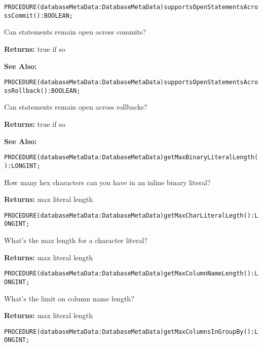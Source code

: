 \verb'PROCEDURE(databaseMetaData:DatabaseMetaData)supportsOpenStatementsAcrossCommit():BOOLEAN;'






Can statements remain open across commits? 


{\bf Returns: } 
true if so 

{\bf See Also:} 




\verb'PROCEDURE(databaseMetaData:DatabaseMetaData)supportsOpenStatementsAcrossRollback():BOOLEAN;'






Can statements remain open across rollbacks? 


{\bf Returns: } 
true if so 

{\bf See Also:} 




\verb'PROCEDURE(databaseMetaData:DatabaseMetaData)getMaxBinaryLiteralLength():LONGINT;'






How many hex characters can you have in an inline binary literal? 


{\bf Returns: } 
max literal length 




\verb'PROCEDURE(databaseMetaData:DatabaseMetaData)getMaxCharLiteralLegth():LONGINT;'






What's the max length for a character literal? 


{\bf Returns: } 
max literal length 




\verb'PROCEDURE(databaseMetaData:DatabaseMetaData)getMaxColumnNameLength():LONGINT;'






What's the limit on column name length? 


{\bf Returns: } 
max literal length 




\verb'PROCEDURE(databaseMetaData:DatabaseMetaData)getMaxColumnsInGroupBy():LONGINT;'






